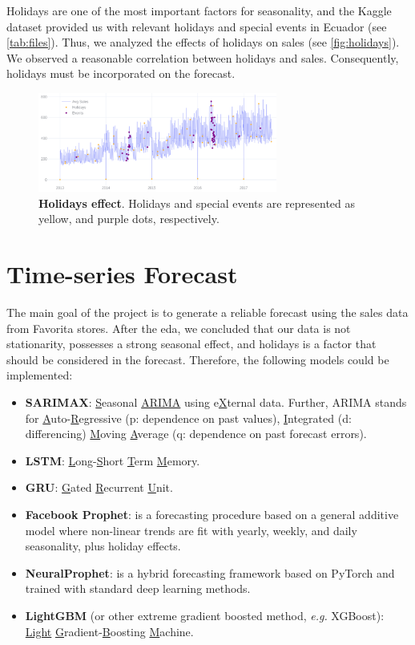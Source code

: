Holidays are one of the most important factors for seasonality, and the Kaggle dataset provided us with relevant holidays and special events in Ecuador (see \autoref{tab:files}). Thus, we analyzed the effects of holidays on sales (see \autoref{fig:holidays}). We observed a reasonable correlation between holidays and sales. Consequently, holidays must be incorporated on the forecast.  

\begin{figure}[!htb]
  \centering
  \includegraphics[width=0.7\textwidth]{plots/eda/holidayeffects.png}
  \caption[Holidays effect]{\textbf{Holidays effect}. Holidays and special events are represented as yellow, and purple dots, respectively.}
  \label{fig:holidays}
\end{figure}

\section[Time-series Forecast]{Time-series Forecast}
\label{sec:forecast}

The main goal of the project is to generate a reliable forecast using the sales data from Favorita stores. After the eda, we concluded that our data is not stationarity, possesses a strong seasonal effect, and holidays is a factor that should be considered in the forecast.  Therefore, the following models could be implemented:

\begin{itemize}
\item \textbf{SARIMAX}: \underline{S}easonal \underline{ARIMA} using e\underline{X}ternal data. Further, ARIMA stands for \underline{A}uto-\underline{R}egressive (p: dependence on past values), \underline{I}ntegrated (d: differencing) \underline{M}oving \underline{A}verage (q: dependence on past forecast errors). 
\item \textbf{LSTM}: \underline{L}ong-\underline{S}hort \underline{T}erm \underline{M}emory.
\item \textbf{GRU}: \underline{G}ated \underline{R}ecurrent \underline{U}nit.
\item \textbf{Facebook Prophet}: is a forecasting procedure based on a general additive model where non-linear trends are fit with yearly, weekly, and daily seasonality, plus holiday effects.
\item \textbf{NeuralProphet}: is a hybrid forecasting framework based on PyTorch and trained with standard deep learning methods.
\item \textbf{LightGBM} (or other extreme gradient boosted method, \textit{e.g.} XGBoost): \underline{Light} \underline{G}radient-\underline{B}oosting \underline{M}achine.
\end{itemize}


